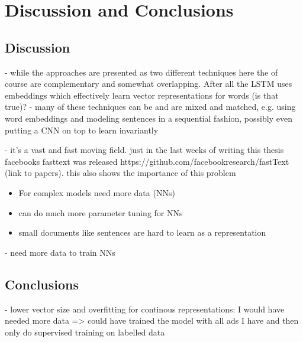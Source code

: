 
\clearpage
\section{Discussion and Conclusions}

\subsection{Discussion}

- while the approaches are presented as two different techniques here the of course are complementary and somewhat overlapping. After all the LSTM uses embeddings which effectively learn vector representations for words (is that true)?
- many of these techniques can be and are mixed and matched, e.g. using word embeddings and modeling sentences in a sequential fashion, possibly even putting a CNN on top to learn invariantly 

- it's a vast and fast moving field. just in the last weeks of writing this thesis facebooks fasttext was released https://github.com/facebookresearch/fastText (link to papers). this also shows the importance of this problem

\begin{itemize}
  \item For complex models need more data (NNs)
  \item can do much more parameter tuning for NNs
  \item small documents like sentences are hard to learn as a representation
\end{itemize}

- need more data to train NNs

\subsection{Conclusions}
\label{subs:conclusions}

- lower vector size and overfitting for continous representations: I would have needed more data => could have trained the model with all ads I have and then only do supervised training on labelled data

